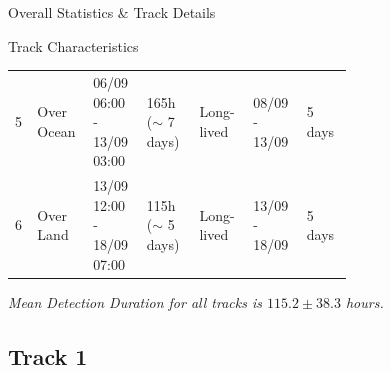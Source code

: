\documentclass[8pt, aspectratio=169]{beamer}
\begin{document}
\begin{frame}{Overall Statistics \& Track Details}
\begin{center}
\begin{block}{Track Characteristics}
\begin{tabular}{p{0.033\linewidth} p{0.085\linewidth} p{0.106\linewidth} p{0.135\linewidth} p{0.108\linewidth} p{0.107\linewidth} p{0.100\linewidth}}
                5                 & Over Ocean                                             & 06/09 06:00 - 13/09 03:00                            & 165h ($\sim$ 7 days)       & Long-lived                                                    & 08/09 - 13/09                     & 5 days                         \\
                6                 & Over Land                                              & 13/09 12:00 - 18/09 07:00                            & 115h ($\sim$ 5 days)       & Long-lived                                                    & 13/09 - 18/09                     & 5 days                         \\
                \bottomrule
            \end{tabular}
        \end{block}
        \tiny \textit{Mean Detection Duration for all tracks is $115.2 \pm 38.3$ hours.}
    \end{center}

    \vspace{-0.6cm}
\end{frame}

\subsection{Track 1}
\end{document}
